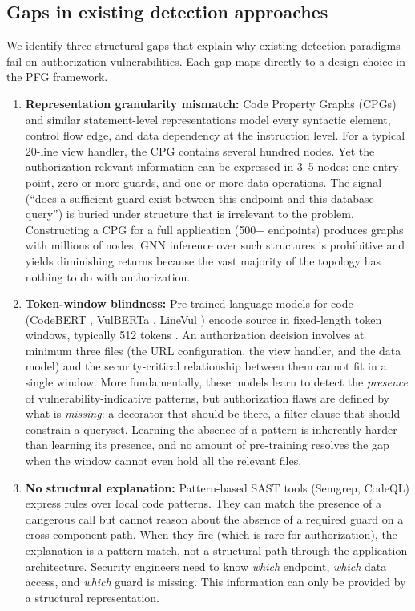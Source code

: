 \subsection{Gaps in existing detection approaches}
\label{sec:det-gaps}

We identify three structural gaps that explain why existing detection
paradigms fail on authorization vulnerabilities. Each gap maps directly to a
design choice in the PFG framework.

\begin{enumerate}

\item \textbf{Representation granularity mismatch:}
Code Property Graphs (CPGs) \citep{yamaguchi2014modeling} and similar
statement-level representations model every syntactic element, control flow
edge, and data dependency at the instruction level. For a typical 20-line
view handler, the CPG contains several hundred nodes. Yet the
authorization-relevant information can be expressed in 3--5 nodes: one entry
point, zero or more guards, and one or more data operations. The signal
(``does a sufficient guard exist between this endpoint and this database
query'') is buried under structure that is irrelevant to the problem.
Constructing a CPG for a full application (500+ endpoints) produces graphs
with millions of nodes; GNN inference over such structures is prohibitive
and yields diminishing returns because the vast majority of the topology has
nothing to do with authorization.

\item \textbf{Token-window blindness:}
Pre-trained language models for code (CodeBERT \citep{feng2020codebert},
VulBERTa \citep{hanif2022vulberta}, LineVul \citep{fu2022linevul}) encode
source in fixed-length token windows, typically 512 tokens
\citep{feng2020codebert}. An authorization decision involves at minimum three
files (the URL configuration, the view handler, and the data model) and the
security-critical relationship between them cannot fit in a single window.
More fundamentally, these models learn to detect the \emph{presence} of
vulnerability-indicative patterns, but authorization flaws are defined by
what is \emph{missing}: a decorator that should be there, a filter clause
that should constrain a queryset. Learning the absence of a pattern is
inherently harder than learning its presence, and no amount of pre-training
resolves the gap when the window cannot even hold all the relevant files.

\item \textbf{No structural explanation:}
Pattern-based SAST tools (Semgrep, CodeQL) express rules over local code
patterns. They can match the presence of a dangerous call but cannot reason
about the absence of a required guard on a cross-component path. When they
fire (which is rare for authorization), the explanation is a pattern match,
not a structural path through the application architecture. Security
engineers need to know \emph{which} endpoint, \emph{which} data access,
and \emph{which} guard is missing. This information can only be provided
by a structural representation.
  
\end{enumerate}


